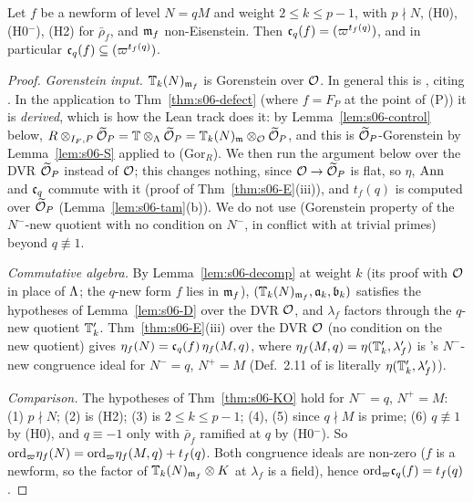 \begin{corollary}\label{cor:s06-fixed}
Let $f$ be a newform of level $N=qM$ and weight $2\le k\le p-1$, with $p\nmid N$, (H0), (H0$^-$), (H2) for $\bar\rho_f$, and $\mathfrak{m}_f$ non-Eisenstein. Then $\mathfrak{c}_q(f)=(\varpi^{t_f(q)})$, and in particular $\mathfrak{c}_q(f)\subseteq(\varpi^{t_f(q)})$. \stpmc{}
\end{corollary}
\begin{proof}
\emph{Gorenstein input.} $\mathbb{T}_k(N)_{\mathfrak{m}_f}$ is Gorenstein over $\mathcal{O}$. In general this is \cite[Prop.~5.1(1)]{KO}
,
citing \cite[Prop.~5.5]{Dim09} \stcited. In the application to Thm~\ref{thm:s06-defect} (where $f=F_P$ at the point of (P)) it is \emph{derived}, which is how the
Lean track does it: by Lemma~\ref{lem:s06-control} below, $R\otimes_{I_F,P}\widetilde{\mathcal{O}}_P=\mathbb{T}\otimes_\Lambda\widetilde{\mathcal{O}}_P=\mathbb{T}_k(N)_{\mathfrak{m}}\otimes_{\mathcal{O}}\widetilde{\mathcal{O}}_P$, and this
is $\widetilde{\mathcal{O}}_P$-Gorenstein by Lemma~\ref{lem:s06-S} applied to (Gor$_R$). We then run the argument below over the DVR $\widetilde{\mathcal{O}}_P$ instead of
$\mathcal{O}$; this changes nothing, since $\mathcal{O}\to\widetilde{\mathcal{O}}_P$ is flat, so $\eta$, $\operatorname{Ann}$ and $\mathfrak{c}_q$ commute with it (proof of
Thm~\ref{thm:s06-E}(iii)), and $t_f(q)$ is computed over $\widetilde{\mathcal{O}}_P$ (Lemma~\ref{lem:s06-tam}(b)). We do not use \cite[Cor.~5.4]{KO} (Gorenstein property of
the $N^-$-new quotient with no condition on $N^-$, in conflict with \cite{BKM} at trivial primes) beyond $q\not\equiv1$.

\emph{Commutative algebra.} By Lemma~\ref{lem:s06-decomp} at weight $k$ (its proof with $\mathcal{O}$ in place of $\Lambda$; the $q$-new form $f$
lies in $\mathfrak{m}_f$), $(\mathbb{T}_k(N)_{\mathfrak{m}_f},\mathfrak{a}_k,\mathfrak{b}_k)$ satisfies the hypotheses of Lemma~\ref{lem:s06-D} over the DVR $\mathcal{O}$, and $\lambda_f$ factors
through the $q$-new quotient $\mathbb{T}'_k$. Thm~\ref{thm:s06-E}(iii) over the DVR $\mathcal{O}$ (no condition on the new quotient) gives
$\eta_f(N)=\mathfrak{c}_q(f)\,\eta_f(M,q)$, where $\eta_f(M,q)=\eta(\mathbb{T}'_k,\lambda'_f)$ is \cite{KO}'s $N^-$-new congruence ideal for $N^-=q$, $N^+=M$
(Def.~2.11 of \cite{KO} is literally $\eta(\mathbb{T}'_k,\lambda'_f)$).

\emph{Comparison.} The hypotheses of Thm~\ref{thm:s06-KO} hold for $N^-=q$, $N^+=M$: (1) $p\nmid N$; (2) is (H2); (3) is
$2\le k\le p-1$; (4), (5) since $q\nmid M$ is prime; (6) $q\not\equiv1$ by (H0), and $q\equiv-1$ only with $\bar\rho_f$ ramified at $q$ by
(H0$^-$). So $\mathrm{ord}_\varpi\eta_f(N)=\mathrm{ord}_\varpi\eta_f(M,q)+t_f(q)$. Both congruence ideals are non-zero ($f$ is a newform, so the factor of
$\mathbb{T}_k(N)_{\mathfrak{m}_f}\otimes K$ at $\lambda_f$ is a field), hence $\mathrm{ord}_\varpi\mathfrak{c}_q(f)=t_f(q)$.
\end{proof}


